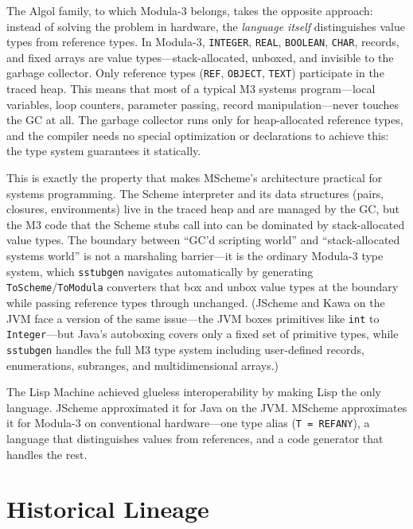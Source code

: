 \documentclass[11pt]{article}
\begin{document}
The Algol family, to which Modula-3 belongs, takes the opposite
approach: instead of solving the problem in hardware, the \emph{language
itself} distinguishes value types from reference types.  In Modula-3,
\texttt{INTEGER}, \texttt{REAL}, \texttt{BOOLEAN}, \texttt{CHAR},
records, and fixed arrays are value types---stack-allocated, unboxed,
and invisible to the garbage collector.  Only reference types
(\texttt{REF}, \texttt{OBJECT}, \texttt{TEXT}) participate in the
traced heap.  This means that most of a typical M3 systems
program---local variables, loop counters, parameter passing, record
manipulation---never touches the GC at all.  The garbage collector
runs only for heap-allocated reference types, and the compiler needs
no special optimization or declarations to achieve this: the type
system guarantees it statically.

This is exactly the property that makes MScheme's architecture
practical for systems programming.  The Scheme interpreter and its
data structures (pairs, closures, environments) live in the traced
heap and are managed by the GC, but the M3 code that the Scheme stubs
call into can be dominated by stack-allocated value types.  The
boundary between ``GC'd scripting world'' and ``stack-allocated systems
world'' is not a marshaling barrier---it is the ordinary Modula-3 type
system, which \texttt{sstubgen} navigates automatically by generating
\texttt{ToScheme}/\texttt{ToModula} converters that box and unbox
value types at the boundary while passing reference types through
unchanged.  (JScheme and Kawa on the JVM face a version of the same
issue---the JVM boxes primitives like \texttt{int} to
\texttt{Integer}---but Java's autoboxing covers only a fixed set of
primitive types, while \texttt{sstubgen} handles the full M3 type
system including user-defined records, enumerations, subranges, and
multidimensional arrays.)

The Lisp Machine achieved glueless interoperability by making Lisp the
only language.  JScheme approximated it for Java on the JVM.  MScheme
approximates it for Modula-3 on conventional hardware---one type alias
(\texttt{T = REFANY}), a language that distinguishes values from
references, and a code generator that handles the rest.


\section{Historical Lineage}
\label{sec:lineage}
\end{document}
